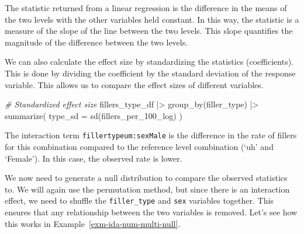 \documentclass[
  letterpaper,
  DIV=11,
  numbers=noendperiod]{scrreprt}
\newenvironment{Shaded}{\begin{snugshade}}{\end{snugshade}}
\newcommand{\AttributeTok}[1]{\textcolor[rgb]{0.00,0.00,0.00}{#1}}
\newcommand{\CommentTok}[1]{\textcolor[rgb]{0.00,0.00,0.00}{\textit{#1}}}
\newcommand{\FunctionTok}[1]{\textcolor[rgb]{0.00,0.00,0.00}{#1}}
\newcommand{\NormalTok}[1]{\textcolor[rgb]{0.00,0.00,0.00}{#1}}
\newcommand{\SpecialCharTok}[1]{\textcolor[rgb]{0.00,0.00,0.00}{#1}}
\theoremstyle{definition}
\theoremstyle{remark}
\begin{document}
\begin{tcolorbox}[enhanced jigsaw, leftrule=.75mm, colframe=quarto-callout-color-frame, colback=white, rightrule=.15mm, opacityback=0, arc=.35mm, breakable, bottomrule=.15mm, left=2mm, toprule=.15mm]

The statistic returned from a linear regression is the difference in the
means of the two levels with the other variables held constant. In this
way, the statistic is a measure of the slope of the line between the two
levels. This slope quantifies the magnitude of the difference between
the two levels.

We can also calculate the effect size by standardizing the statistics
(coefficients). This is done by dividing the coefficient by the standard
deviation of the response variable. This allows us to compare the effect
sizes of different variables.

\begin{Shaded}
\begin{Highlighting}[]
\CommentTok{\# Standardized effect size}
\NormalTok{fillers\_type\_df  }\SpecialCharTok{|\textgreater{}}
  \FunctionTok{group\_by}\NormalTok{(filler\_type) }\SpecialCharTok{|\textgreater{}}
  \FunctionTok{summarize}\NormalTok{(}
    \AttributeTok{type\_sd =} \FunctionTok{sd}\NormalTok{(fillers\_per\_100\_log)}
\NormalTok{  )}
\end{Highlighting}
\end{Shaded}

\end{tcolorbox}

The interaction term \texttt{fillertypeum:sexMale} is the difference in
the rate of fillers for this combination compared to the reference level
combination (`uh' and `Female'). In this case, the observed rate is
lower.

We now need to generate a null distribution to compare the observed
statistics to. We will again use the permutation method, but since there
is an interaction effect, we need to shuffle the \texttt{filler\_type}
and \texttt{sex} variables together. This ensures that any relationship
between the two variables is removed. Let's see how this works in
Example~\ref{exm-ida-num-multi-null}.
\end{document}
